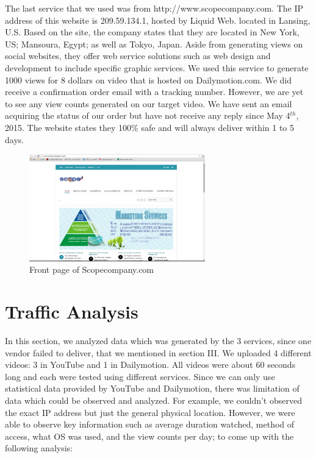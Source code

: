 \documentclass[conference]{IEEEtran}
\begin{document}
The last service that we used was from http://www.scopecompany.com. The IP address of this website is 209.59.134.1, hosted by Liquid Web. located in Lansing, U.S. Based on the site, the company states that they are located in New York, US; Mansoura, Egypt; as well as Tokyo, Japan. Aside from generating views on social websites, they offer web service solutions such as web design and development to include specific graphic services.
We used this service to generate 1000 views for 8 dollars on video that is hosted on Dailymotion.com. We did receive a confirmation order email with a tracking number. However, we are yet to see any view counts generated on our target video. We have sent an email acquiring the status of our order but have not receive any reply since May 4$^{th}$, 2015. The website states they 100\% safe and will always deliver within 1 to 5 days.

\begin{figure}
  \centering
  \includegraphics[width=3.0in]{fig4}
  \caption{Front page of Scopecompany.com}
\end{figure}

\section{Traffic Analysis}

In this section, we analyzed data which was generated by the 3 services, since one vendor failed to deliver, that we mentioned in section III. We uploaded 4 different videos: 3 in YouTube and 1 in Dailymotion. All videos were about 60 seconds long and each were tested using different services. Since we can only use statistical data provided by YouTube and Dailymotion, there was limitation of data which could be observed and analyzed. For example, we couldn’t observed the exact IP address but just the general physical location. However, we were able to observe key information such as average duration watched, method of access, what OS was used, and the view counts per day; to come up with the following analysis:
\end{document}
